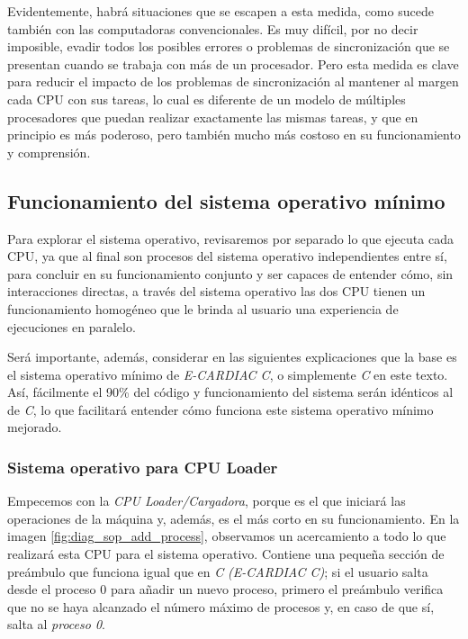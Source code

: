 \documentclass[letterpaper,12pt,oneside]{book}
\begin{document}
     		Evidentemente, habrá situaciones que se escapen a esta medida, como sucede también con las computadoras convencionales. Es muy difícil, por
     		no decir imposible, evadir todos los posibles errores o problemas de sincronización que se presentan cuando se trabaja con más de un 
     		procesador. Pero esta medida 
     		es clave para reducir el impacto de los problemas de sincronización al mantener al margen cada CPU con sus tareas,
     		lo cual es diferente de un modelo de múltiples procesadores que puedan realizar exactamente las mismas tareas, y que en principio es más 
     		poderoso, pero
     		también mucho más costoso en su funcionamiento y  comprensión.
	 	\clearpage
	 	\subsection{Funcionamiento del sistema operativo mínimo}
			
			Para explorar el sistema operativo, revisaremos por separado lo que ejecuta cada CPU, ya que al final son procesos
			del sistema operativo independientes entre sí, para concluir en su funcionamiento conjunto y ser capaces
			de entender cómo, sin interacciones directas, a través del sistema operativo las dos CPU tienen un funcionamiento homogéneo 
			que le brinda al usuario una experiencia de ejecuciones en paralelo.
			
			Será importante, además, considerar en las siguientes explicaciones que la base es el sistema operativo mínimo 
			de \textit{E-CARDIAC C}, o simplemente \textit{C} en este texto. 
			Así, fácilmente el 90\% del código y funcionamiento del sistema serán idénticos al de  \textit{C}, lo que facilitará entender cómo 
			funciona este
			sistema operativo mínimo mejorado.

	 	
		 	\subsubsection{ Sistema operativo para CPU Loader }
		 	
		 		Empecemos con la \textit{CPU Loader/Cargadora}, porque es el que iniciará las operaciones de la máquina y, además, es el más corto en su 
		 		funcionamiento. En
		 		la imagen \ref{fig:diag_sop_add_process}, observamos un acercamiento a todo lo que realizará esta CPU para el sistema operativo. 
		 		Contiene 
		 		una pequeña
		 		sección de preámbulo que funciona igual que en \textit{C} \textit{(E-CARDIAC C)};
		 		si el usuario salta desde el proceso 0 para añadir un nuevo proceso, primero el preámbulo verifica que no se haya alcanzado el número 
		 		máximo de procesos y, en caso de que sí, salta al \textit{proceso 0}. 
		 		
\end{document}
